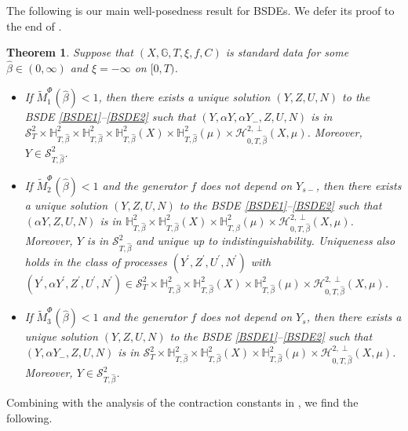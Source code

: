 \documentclass[10pt]{article} %
\newtheorem{theorem}{Theorem}[section]
\newcommand\cH{\mathcal H}
\newcommand\cS{\mathcal S}
\def \G{\mathbb{G}}
\def \H{\mathbb{H}}
\begin{document}
The following is our main well-posedness result for BSDEs. We defer its proof to the end of .


\begin{theorem}\label{thm::main_bsde}
	Suppose that $(X,\G,T,\xi,f,C)$ is standard data for some $\hat\beta \in (0,\infty)$ and $\xi = -\infty$ on $[0,T)$.
	
	\begin{itemize}
	\item[$(i)$] If $\widetilde M_1^\Phi(\hat\beta) < 1$, then there exists a unique solution $(Y,Z,U,N)$ to the {\rm BSDE} \ref{BSDE1}--\ref{BSDE2} such that $(Y,\alpha Y,\alpha Y_-,Z,U,N)$ is in $\cS^2_T \times \H^2_{T,\hat\beta} \times \H^2_{T,\hat\beta} \times \H^2_{T,\hat\beta}(X) \times \H^2_{T,\hat\beta}(\mu) \times \cH^{2,\perp}_{0,T,\hat\beta}(X,\mu)$. Moreover, $Y \in \cS^2_{T,\hat\beta}$. %
	
	
	\item[$(ii)$] If $\widetilde M_2^\Phi(\hat\beta) < 1$ and the generator $f$ does not depend on $Y_{s-}$, then there exists a unique solution $(Y,Z,U,N)$ to the {\rm BSDE} \ref{BSDE1}--\ref{BSDE2} such that $(\alpha Y,Z,U,N)$ is in $\H^2_{T,\hat\beta} \times \H^2_{T,\hat\beta}(X) \times \H^2_{T,\hat\beta}(\mu) \times \cH^{2,\perp}_{0,T,\hat\beta}(X,\mu)$. Moreover, $Y$ is in $\cS^2_{T,\hat\beta}$ and unique up to indistinguishability. Uniqueness also holds in the class of processes $(Y^\prime, Z^\prime, U^\prime, N^\prime)$ with $( Y^\prime, \alpha Y^\prime, Z^\prime, U^\prime, N^\prime) \in \cS^2_T \times \H^2_{T,\hat\beta} \times \H^2_{T,\hat\beta}(X) \times \H^2_{T,\hat\beta}(\mu) \times \cH^{2,\perp}_{0,T,\hat\beta}(X,\mu)$. %


	\item[$(iii)$] If $\widetilde M_3^\Phi(\hat\beta) < 1$ and the generator $f$ does not depend on $Y_s$, then there exists a unique solution $(Y,Z,U,N)$ to the {\rm BSDE} \ref{BSDE1}--\ref{BSDE2} such that $(Y,\alpha Y_-,Z,U,N)$ is in $\cS^2_T \times \H^2_{T,\hat\beta} \times \H^2_{T,\hat\beta}(X) \times \H^2_{T,\hat\beta}(\mu) \times \cH^{2,\perp}_{0,T,\hat\beta}(X,\mu)$. Moreover, $Y \in \cS^2_{T,\hat\beta}$.
	\end{itemize}
\end{theorem}

Combining  with the analysis of the contraction constants in , we find the following.
\end{document}
